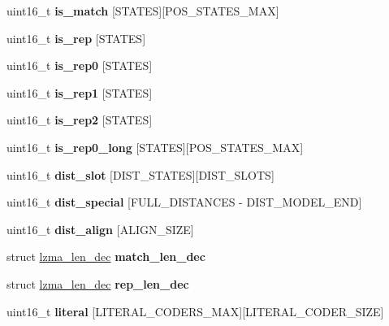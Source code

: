\begin{DoxyCompactItemize}
uint16\+\_\+t {\bfseries is\+\_\+match} \mbox{[}S\+T\+A\+T\+ES\mbox{]}\mbox{[}P\+O\+S\+\_\+\+S\+T\+A\+T\+E\+S\+\_\+\+M\+AX\mbox{]}
\item 
\mbox{\label{structlzma__dec_aa044f79ee4987a4b715bf91a2a9c1ab8}} 
uint16\+\_\+t {\bfseries is\+\_\+rep} \mbox{[}S\+T\+A\+T\+ES\mbox{]}
\item 
\mbox{\label{structlzma__dec_a22e93e92a806ea5777e53299663427c7}} 
uint16\+\_\+t {\bfseries is\+\_\+rep0} \mbox{[}S\+T\+A\+T\+ES\mbox{]}
\item 
\mbox{\label{structlzma__dec_abb5e9043e1536028b1e9b5ad2ee1d33d}} 
uint16\+\_\+t {\bfseries is\+\_\+rep1} \mbox{[}S\+T\+A\+T\+ES\mbox{]}
\item 
\mbox{\label{structlzma__dec_a6dadc0319bb3c95362e3acb79cd64870}} 
uint16\+\_\+t {\bfseries is\+\_\+rep2} \mbox{[}S\+T\+A\+T\+ES\mbox{]}
\item 
\mbox{\label{structlzma__dec_a8e790830da2b21a074ccc52c3836c395}} 
uint16\+\_\+t {\bfseries is\+\_\+rep0\+\_\+long} \mbox{[}S\+T\+A\+T\+ES\mbox{]}\mbox{[}P\+O\+S\+\_\+\+S\+T\+A\+T\+E\+S\+\_\+\+M\+AX\mbox{]}
\item 
\mbox{\label{structlzma__dec_a0e01cf57daf83a2a7677dd2d3c0a35d9}} 
uint16\+\_\+t {\bfseries dist\+\_\+slot} \mbox{[}D\+I\+S\+T\+\_\+\+S\+T\+A\+T\+ES\mbox{]}\mbox{[}D\+I\+S\+T\+\_\+\+S\+L\+O\+TS\mbox{]}
\item 
\mbox{\label{structlzma__dec_ae35194835c78de13b756611a8e41a662}} 
uint16\+\_\+t {\bfseries dist\+\_\+special} \mbox{[}F\+U\+L\+L\+\_\+\+D\+I\+S\+T\+A\+N\+C\+ES -\/ D\+I\+S\+T\+\_\+\+M\+O\+D\+E\+L\+\_\+\+E\+ND\mbox{]}
\item 
\mbox{\label{structlzma__dec_a73084d4589a9191797256ea18dd78f1c}} 
uint16\+\_\+t {\bfseries dist\+\_\+align} \mbox{[}A\+L\+I\+G\+N\+\_\+\+S\+I\+ZE\mbox{]}
\item 
\mbox{\label{structlzma__dec_a61ab0a32d13b6ebb792b36099d9a52c9}} 
struct \mbox{\hyperlink{structlzma__len__dec}{lzma\+\_\+len\+\_\+dec}} {\bfseries match\+\_\+len\+\_\+dec}
\item 
\mbox{\label{structlzma__dec_a1764534abd3d0809974b83bc44cdc5eb}} 
struct \mbox{\hyperlink{structlzma__len__dec}{lzma\+\_\+len\+\_\+dec}} {\bfseries rep\+\_\+len\+\_\+dec}
\item 
\mbox{\label{structlzma__dec_a3887926554ad011ff2a3a52e1d49a39a}} 
uint16\+\_\+t {\bfseries literal} \mbox{[}L\+I\+T\+E\+R\+A\+L\+\_\+\+C\+O\+D\+E\+R\+S\+\_\+\+M\+AX\mbox{]}\mbox{[}L\+I\+T\+E\+R\+A\+L\+\_\+\+C\+O\+D\+E\+R\+\_\+\+S\+I\+ZE\mbox{]}
\end{DoxyCompactItemize}


